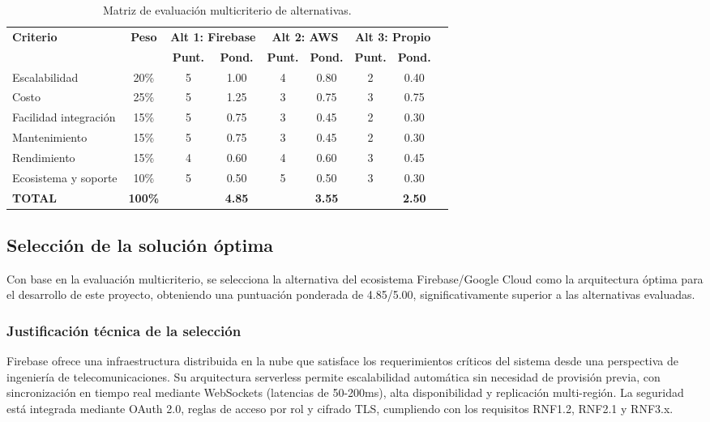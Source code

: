 \begin{table}[H]
\centering
\caption{Matriz de evaluación multicriterio de alternativas.}
\label{tab:matriz_evaluacion}
\begin{tabular}{@{}lcccccccc@{}}
\toprule
\textbf{Criterio} & \textbf{Peso} & \multicolumn{2}{c}{\textbf{Alt 1: Firebase}} & \multicolumn{2}{c}{\textbf{Alt 2: AWS}} & \multicolumn{2}{c}{\textbf{Alt 3: Propio}} \\
\cmidrule(lr){3-4} \cmidrule(lr){5-6} \cmidrule(lr){7-8}
& & \textbf{Punt.} & \textbf{Pond.} & \textbf{Punt.} & \textbf{Pond.} & \textbf{Punt.} & \textbf{Pond.} \\
\midrule
Escalabilidad & 20\% & 5 & 1.00 & 4 & 0.80 & 2 & 0.40 \\
Costo & 25\% & 5 & 1.25 & 3 & 0.75 & 3 & 0.75 \\
Facilidad integración & 15\% & 5 & 0.75 & 3 & 0.45 & 2 & 0.30 \\
Mantenimiento & 15\% & 5 & 0.75 & 3 & 0.45 & 2 & 0.30 \\
Rendimiento & 15\% & 4 & 0.60 & 4 & 0.60 & 3 & 0.45 \\
Ecosistema y soporte & 10\% & 5 & 0.50 & 5 & 0.50 & 3 & 0.30 \\
\midrule
\textbf{TOTAL} & \textbf{100\%} & & \textbf{4.85} & & \textbf{3.55} & & \textbf{2.50} \\
\bottomrule
\end{tabular}
\end{table}

\subsection{Selección de la solución óptima}

Con base en la evaluación multicriterio, se selecciona la alternativa del ecosistema Firebase/Google Cloud como la arquitectura óptima para el desarrollo de este proyecto, obteniendo una puntuación ponderada de 4.85/5.00, significativamente superior a las alternativas evaluadas.

\subsubsection{Justificación técnica de la selección}

Firebase ofrece una infraestructura distribuida en la nube que satisface los requerimientos críticos del sistema desde una perspectiva de ingeniería de telecomunicaciones. Su arquitectura serverless permite escalabilidad automática sin necesidad de provisión previa, con sincronización en tiempo real mediante WebSockets (latencias de 50-200ms), alta disponibilidad y replicación multi-región. La seguridad está integrada mediante OAuth 2.0, reglas de acceso por rol y cifrado TLS, cumpliendo con los requisitos RNF1.2, RNF2.1 y RNF3.x.

